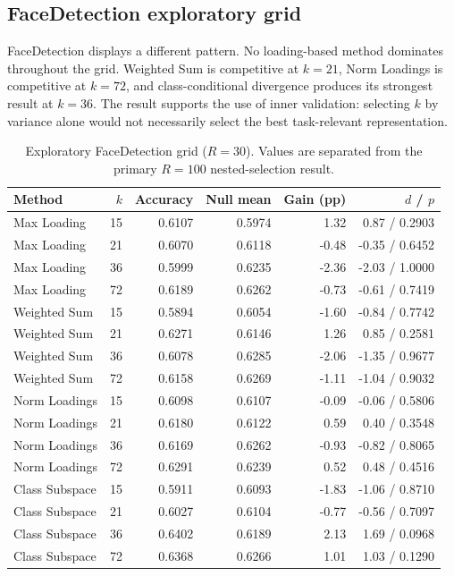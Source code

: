 \subsection{FaceDetection exploratory grid}
FaceDetection displays a different pattern. No loading-based method dominates throughout the grid. Weighted Sum is competitive at $k=21$, Norm Loadings is competitive at $k=72$, and class-conditional divergence produces its strongest result at $k=36$. The result supports the use of inner validation: selecting $k$ by variance alone would not necessarily select the best task-relevant representation.

\begin{table}[H]
\centering
\caption{Exploratory FaceDetection grid ($R=30$). Values are separated from the primary $R=100$ nested-selection result.}
\label{tab:face-grid}
\scriptsize
\begin{tabular}{@{}lrrrrr@{}}
\toprule
Method & $k$ & Accuracy & Null mean & Gain (pp) & $d$ / $p$\\
\midrule
Max Loading & 15 & 0.6107 & 0.5974 & 1.32 & 0.87 / 0.2903\\
Max Loading & 21 & 0.6070 & 0.6118 & -0.48 & -0.35 / 0.6452\\
Max Loading & 36 & 0.5999 & 0.6235 & -2.36 & -2.03 / 1.0000\\
Max Loading & 72 & 0.6189 & 0.6262 & -0.73 & -0.61 / 0.7419\\
Weighted Sum & 15 & 0.5894 & 0.6054 & -1.60 & -0.84 / 0.7742\\
Weighted Sum & 21 & 0.6271 & 0.6146 & 1.26 & 0.85 / 0.2581\\
Weighted Sum & 36 & 0.6078 & 0.6285 & -2.06 & -1.35 / 0.9677\\
Weighted Sum & 72 & 0.6158 & 0.6269 & -1.11 & -1.04 / 0.9032\\
Norm Loadings & 15 & 0.6098 & 0.6107 & -0.09 & -0.06 / 0.5806\\
Norm Loadings & 21 & 0.6180 & 0.6122 & 0.59 & 0.40 / 0.3548\\
Norm Loadings & 36 & 0.6169 & 0.6262 & -0.93 & -0.82 / 0.8065\\
Norm Loadings & 72 & 0.6291 & 0.6239 & 0.52 & 0.48 / 0.4516\\
Class Subspace & 15 & 0.5911 & 0.6093 & -1.83 & -1.06 / 0.8710\\
Class Subspace & 21 & 0.6027 & 0.6104 & -0.77 & -0.56 / 0.7097\\
Class Subspace & 36 & 0.6402 & 0.6189 & 2.13 & 1.69 / 0.0968\\
Class Subspace & 72 & 0.6368 & 0.6266 & 1.01 & 1.03 / 0.1290\\
\bottomrule
\end{tabular}
\end{table}


